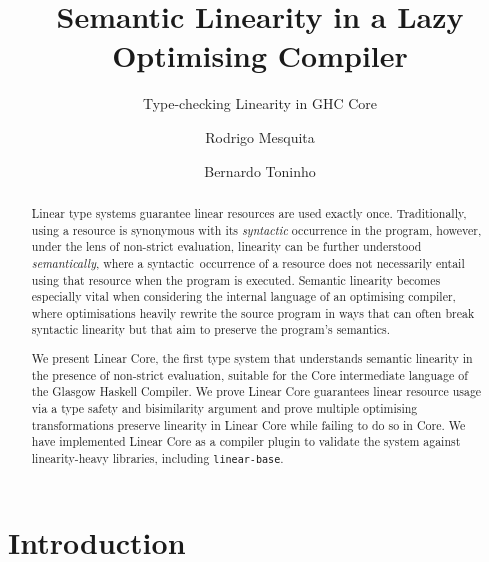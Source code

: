 \documentclass[acmsmall,review,anonymous,screen]{acmart}
\title{Semantic Linearity in a Lazy Optimising Compiler}
\subtitle{Type-checking Linearity in GHC Core}
\author{Rodrigo Mesquita}
\affiliation{
  \department{Departamento de Inform\'{a}tica}
  \institution{FCT-NOVA, Universidade Nova de Lisboa}
  \country{Portugal}}
\affiliation{
   \institution{Well-Typed LLP}
 }
\author{Bernardo Toninho}
\affiliation{
  \department{Departamento de Inform\'{a}tica}
  \institution{NOVA-LINCS, FCT-NOVA, Universidade Nova de Lisboa}
  \country{Portugal}}
\begin{document}
\begin{abstract}
Linear type systems guarantee linear resources are used exactly once.
Traditionally, using a resource is synonymous with its \emph{syntactic}
occurrence in the program, however, under the lens of non-strict evaluation,
linearity can be further understood \emph{semantically}, where a
syntactic occurrence of a resource does not necessarily entail
using that resource when the program is executed.
Semantic linearity becomes especially vital when considering the
internal language of an optimising compiler, where optimisations
heavily rewrite the source program in ways that can often break
syntactic linearity but that aim to preserve the program's semantics.
%

We present Linear Core, the first type system that understands semantic
linearity in the presence of non-strict evaluation, suitable for the Core
intermediate language of the Glasgow Haskell Compiler. We prove Linear Core
guarantees linear resource usage via a type safety and bisimilarity argument and prove
multiple optimising transformations preserve linearity in Linear Core while
failing to do so in Core. We have implemented Linear Core as a compiler
plugin to validate the system against linearity-heavy libraries, including
\texttt{linear-base}.%
\end{abstract}

\maketitle

\section{Introduction}\label{sec:intro}

\end{document}
